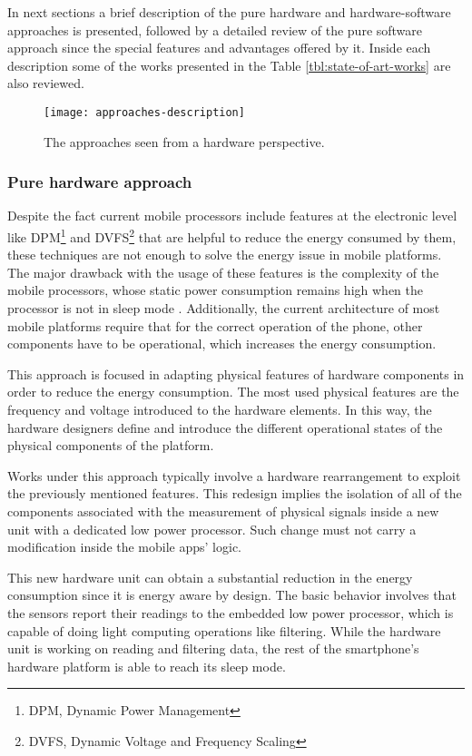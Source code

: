 In next sections a brief description of the pure hardware and hardware-software approaches is presented, followed by a detailed review of the pure software approach since the special features and advantages offered by it.
Inside each description some of the works presented in the Table \ref{tbl:state-of-art-works} are also reviewed.

\begin{figure}
\centering
\texttt{[image: approaches-description]}
\caption[Approaches seen from hardware perspective]{The approaches seen from a hardware perspective.}
\label{fig:approaches-description}
\end{figure}

\subsubsection{Pure hardware approach}

Despite the fact current mobile processors include features at the electronic level like DPM\footnote{DPM, Dynamic Power Management} and DVFS\footnote{DVFS, Dynamic Voltage and Frequency Scaling} that are helpful to reduce the energy consumed by them, these techniques are not enough to solve the energy issue in mobile platforms.
The major drawback with the usage of these features is the complexity of the mobile processors, whose static power consumption remains high when the processor is not in sleep mode \cite{Priyantha2011}.
Additionally, the current architecture of most mobile platforms require that for the correct operation of the phone, other components have to be operational, which increases the energy consumption.

This approach is focused in adapting physical features of hardware components in order to reduce the energy consumption.
The most used physical features are the frequency and voltage introduced to the hardware elements.
In this way, the hardware designers define and introduce the different operational states of the physical components of the platform.

Works under this approach typically involve a hardware rearrangement to exploit the previously mentioned features.
This redesign implies the isolation of all of the components associated with the measurement of physical signals inside a new unit with a dedicated low power processor.
Such change must not carry a modification inside the mobile apps' logic.

This new hardware unit can obtain a substantial reduction in the energy consumption since it is energy aware by design.
The basic behavior involves that the sensors report their readings to the embedded low power processor, which is capable of doing light computing operations like filtering.
While the hardware unit is working on reading and filtering data, the rest of the smartphone's hardware platform is able to reach its sleep mode.

